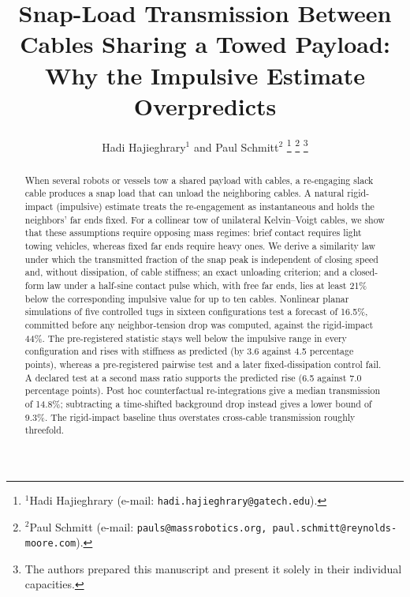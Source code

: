 \documentclass[letterpaper,10pt,conference]{ieeeconf}
\title{\LARGE\bf Snap-Load Transmission Between Cables Sharing a Towed Payload: Why the Impulsive Estimate Overpredicts}
\author{%
Hadi Hajieghrary$^{1}$ and Paul Schmitt$^{2}$%
\thanks{$^{1}$Hadi Hajieghrary (e-mail: \texttt{hadi.hajieghrary@gatech.edu}).}%
\thanks{$^{2}$Paul Schmitt (e-mail: \texttt{pauls@massrobotics.org, paul.schmitt@reynolds-moore.com}).}%
\thanks{The authors prepared this manuscript and present it solely in their individual capacities.}%
}
\begin{document}
\maketitle
\thispagestyle{empty}
\pagestyle{empty}

\begin{abstract}
When several robots or vessels tow a shared payload with cables, a re-engaging slack cable produces a snap load that can unload the neighboring cables. A natural rigid-impact (impulsive) estimate treats the re-engagement as instantaneous and holds the neighbors' far ends fixed. For a collinear tow of unilateral Kelvin--Voigt cables, we show that these assumptions require opposing mass regimes: brief contact requires light towing vehicles, whereas fixed far ends require heavy ones. We derive a similarity law under which the transmitted fraction of the snap peak is independent of closing speed and, without dissipation, of cable stiffness; an exact unloading criterion; and a closed-form law under a half-sine contact pulse which, with free far ends, lies at least 21\% below the corresponding impulsive value for up to ten cables. Nonlinear planar simulations of five controlled tugs in sixteen configurations test a forecast of 16.5\%, committed before any neighbor-tension drop was computed, against the rigid-impact 44\%. The pre-registered statistic stays well below the impulsive range in every configuration and rises with stiffness as predicted (by 3.6 against 4.5 percentage points), whereas a pre-registered pairwise test and a later fixed-dissipation control fail. A declared test at a second mass ratio supports the predicted rise (6.5 against 7.0 percentage points). Post hoc counterfactual re-integrations give a median transmission of 14.8\%; subtracting a time-shifted background drop instead gives a lower bound of 9.3\%. The rigid-impact baseline thus overstates cross-cable transmission roughly threefold.
\end{abstract}










\end{document}
